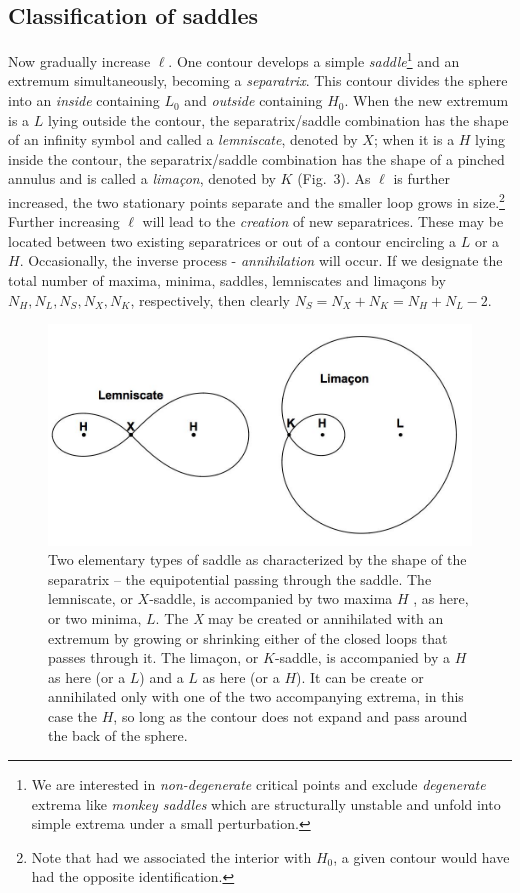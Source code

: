 \documentclass[useAMS,usenatbib,a4paper]{mn2e}
\begin{document}
\subsection{Classification of saddles}

Now gradually increase $\ell$. One contour develops a simple
\emph{saddle}\footnote{We are interested in \emph{non-degenerate}
critical points and exclude \emph{degenerate} extrema like
\emph{monkey saddles} which are structurally unstable and unfold into
simple extrema under a small perturbation.} and an extremum
simultaneously, becoming a \emph{separatrix}. This contour divides the
sphere into an \emph{inside} containing $L_0$ and \emph{outside}
containing $H_0$. When the new extremum is a $L$ lying outside the
contour, the separatrix/saddle combination has the shape of an
infinity symbol and called a \emph{lemniscate}, denoted by $X$; when
it is a $H$ lying inside the contour, the separatrix/saddle
combination has the shape of a pinched annulus and is called a
\emph{lima\c con}, denoted by $K$ (Fig.~3). As $\ell$ is further
increased, the two stationary points separate and the smaller loop
grows in size.\footnote{Note that had we associated the interior with
$H_0$, a given contour would have had the opposite identification.}
Further increasing $\ell$ will lead to the \emph{creation} of new
separatrices. These may be located between two existing separatrices
or out of a contour encircling a $L$ or a $H$.  Occasionally, the
inverse process - \emph{annihilation} will occur. If we designate the
total  number of maxima, minima, saddles, lemniscates and lima\c cons
by $N_H,N_L,N_S,N_X,N_K$, respectively, then clearly
$N_S=N_X+N_K=N_H+N_L-2$.

\begin{figure}
\centering
\includegraphics[width=0.9\linewidth]{fig3.jpg}
\caption{Two elementary types of saddle as characterized by the shape of the separatrix -- the equipotential passing through the saddle. The lemniscate, or $X$-saddle, is accompanied by two maxima $H$ , as here, or two minima, $L$. The \emph X may be created or annihilated with an extremum by growing or shrinking either of the closed loops that passes through it. The lima\c con, or $K$-saddle, is accompanied by a $H$ as here (or a $L$) and a $L$ as here (or a $H$). It can be create or annihilated only with one of the two accompanying extrema, in this case the $H$, so long as the contour does not expand and pass around the back of the sphere.}
\end{figure}
\end{document}
